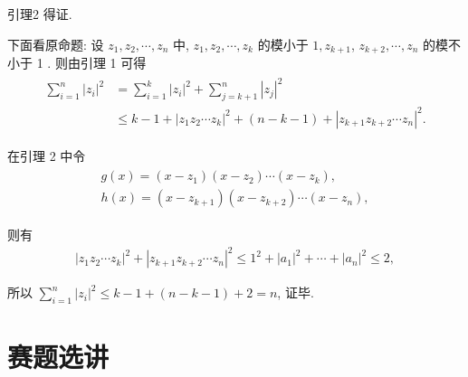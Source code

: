 \begin{solution}
	引理2 得证.

	下面看原命题: 设 $z_1, z_2, \cdots, z_n$ 中, $z_1, z_2, \cdots, z_k$ 的模小于 $1, z_{k+1}$, $z_{k+2}, \cdots, z_n$ 的模不小于 1 . 则由引理 1 可得
	\begin{align*}
		\begin{aligned}
			\sum_{i=1}^n\left|z_i\right|^2 & =\sum_{i=1}^k\left|z_i\right|^2+\sum_{j=k+1}^n\left|z_j\right|^2                                    \\
			                               & \leqslant k-1+\left|z_1 z_2 \cdots z_k\right|^2+(n-k-1)+\left|z_{k+1} z_{k+2} \cdots z_n\right|^2 .
		\end{aligned}
	\end{align*}

	在引理 2 中令
	\begin{align*}
		\begin{gathered}
			g(x)=\left(x-z_1\right)\left(x-z_2\right) \cdots\left(x-z_k\right), \\
			h(x)=\left(x-z_{k+1}\right)\left(x-z_{k+2}\right) \cdots\left(x-z_n\right),
		\end{gathered}
	\end{align*}

	则有
	\begin{align*}
		\left|z_1 z_2 \cdots z_k\right|^2+\left|z_{k+1} z_{k+2} \cdots z_n\right|^2 \leqslant 1^2+\left|a_1\right|^2+\cdots+\left|a_n\right|^2 \leqslant 2,
	\end{align*}

	所以 $\sum_{i=1}^n\left|z_i\right|^2 \leqslant k-1+(n-k-1)+2=n$, 证毕.
\end{solution}


\section{赛题选讲}